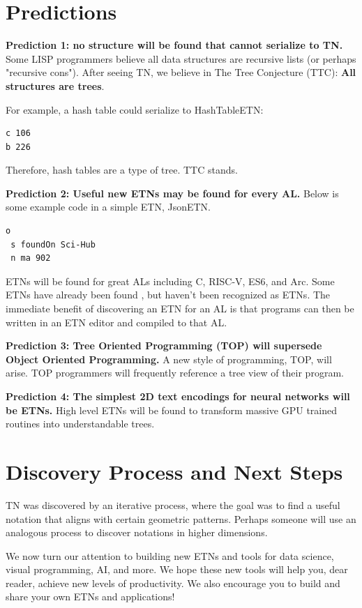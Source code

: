 \documentclass[journal]{IEEEtran}
\begin{document}
\section{Predictions}

\textbf{Prediction 1: no structure will be found that cannot serialize to TN.} Some LISP programmers believe all data structures are recursive lists (or perhaps "recursive cons"). After seeing TN, we believe in The Tree Conjecture (TTC): \textbf{All structures are trees}.

For example, a hash table could serialize to HashTableETN:

\begin{lstlisting}
c 106
b 226
\end{lstlisting}

Therefore, hash tables are a type of tree. TTC stands.

\textbf{Prediction 2: Useful new ETNs may be found for every AL.} Below is some example code in a simple ETN, JsonETN.

\begin{lstlisting}
o
 s foundOn Sci-Hub
 n ma 902
\end{lstlisting}

ETNs will be found for great ALs including C, RISC-V, ES6, and Arc. Some ETNs have already been found \cite{Roughan}, but haven't been recognized as ETNs. The immediate benefit of discovering an ETN for an AL is that programs can then be written in an ETN editor and compiled to that AL.

\textbf{Prediction 3: Tree Oriented Programming (TOP) will supersede Object Oriented Programming.} A new style of programming, TOP, will arise. TOP programmers will frequently reference a tree view of their program.

\textbf{Prediction 4: The simplest 2D text encodings for neural networks will be ETNs.} High level ETNs will be found to transform massive GPU trained routines into understandable trees.

\section{Discovery Process and Next Steps}

TN was discovered by an iterative process, where the goal was to find a useful notation that aligns with certain geometric patterns. Perhaps someone will use an analogous process to discover notations in higher dimensions.

We now turn our attention to building new ETNs and tools for data science, visual programming, AI, and more. We hope these new tools will help you, dear reader, achieve new levels of productivity. We also encourage you to build and share your own ETNs and applications!
\end{document}
